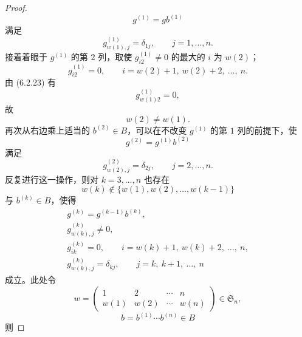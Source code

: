 \begin{proof}
\begin{equation}
  g^{(1)}=gb^{(1)}
  \tag{6.2.22}
\end{equation}
满足
\begin{equation}
  g^{(1)}_{w(1),j}=\delta_{1j},\qquad j=1,\dots,n.
  \tag{6.2.23}
\end{equation}
接着着眼于 $g^{(1)}$ 的第 $2$ 列，取使 $g^{(1)}_{i2}\ne0$ 的最大的 $i$ 为 $w(2)$；
\begin{equation}
  g^{(1)}_{i2}=0,\qquad i=w(2)+1,\ w(2)+2,\ \dots,\ n.
  \tag{6.2.24}
\end{equation}
由 (6.2.23) 有
\begin{equation}
  g^{(1)}_{w(1)2}=0,
  \tag{6.2.25}
\end{equation}
故
\begin{equation}
  w(2)\ne w(1).
  \tag{6.2.26}
\end{equation}
再次从右边乘上适当的 $b^{(2)}\in B$，可以在不改变 $g^{(1)}$ 的第 $1$ 列的前提下，使
\begin{equation}
  g^{(2)}=g^{(1)}b^{(2)}
  \tag{6.2.27}
\end{equation}
满足
\begin{equation}
  g^{(2)}_{w(2),j}=\delta_{2j},\qquad j=2,\dots,n.
  \tag{6.2.28}
\end{equation}
反复进行这一操作，则对 $k=3,\dots,n$ 也存在
\begin{equation}
  w(k)\notin\{w(1),w(2),\dots,w(k-1)\}
  \tag{6.2.29}
\end{equation}
与 $b^{(k)}\in B$，使得
\begin{gather}
  g^{(k)}=g^{(k-1)}b^{(k)}, \tag{6.2.30}\\
  g^{(k)}_{w(k),j}\ne0, \tag{6.2.31}\\
  g^{(k)}_{ik}=0,\qquad i=w(k)+1,\ w(k)+2,\ \dots,\ n, \tag{6.2.32}\\
  g^{(k)}_{w(k),j}=\delta_{kj},\qquad j=k,\ k+1,\ \dots,\ n \tag{6.2.33}
\end{gather}
成立。此处令
\begin{equation}
  w=\begin{pmatrix}
    1 & 2 & \cdots & n\\
    w(1) & w(2) & \cdots & w(n)
  \end{pmatrix}\in\mathfrak{S}_n,
  \tag{6.2.34}
\end{equation}
\begin{equation}
  b=b^{(1)}\cdots b^{(n)}\in B
  \tag{6.2.35}
\end{equation}
则


\end{proof}
